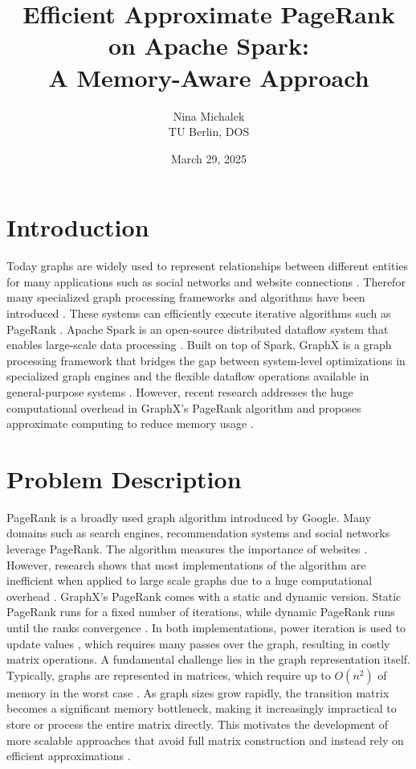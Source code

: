 \documentclass[a4paper,12pt]{article}
\title{Efficient Approximate PageRank on Apache Spark: \\ A Memory-Aware Approach}
\author{Nina Michalek\\TU Berlin, DOS}
\date{March 29, 2025}
\begin{document}
\maketitle

\begin{multicols}{2}

\section{Introduction}
Today graphs are widely used to represent relationships between different entities for many applications such as social networks and website connections \cite{zhang_distributed_2021}. Therefor many specialized graph processing frameworks and algorithms have been introduced \cite{meng_survey_2024}. These systems can efficiently execute iterative algorithms such as PageRank \cite{gonzalez_graphx_nodate}. Apache Spark is an open-source distributed dataflow system that enables large-scale data processing \cite{shanahan_large_2015}. Built on top of Spark, GraphX is a graph processing framework that bridges the gap between system-level optimizations in specialized graph engines and the flexible dataflow operations available in general-purpose systems \cite{noauthor_software_nodate}\cite{gonzalez_graphx_nodate}. However, recent research addresses the huge computational overhead in GraphX's PageRank algorithm and proposes approximate computing to reduce memory usage \cite{wu_efficient_2024}. 
 

\section{Problem Description}
PageRank is a broadly used graph algorithm introduced by Google. Many domains such as search engines, recommendation systems and social networks leverage PageRank. The algorithm measures the importance of websites \cite{wu_efficient_2024}. However, research shows that most implementations of the algorithm are inefficient when applied to large scale graphs due to a huge computational overhead \cite{wu_efficient_2024}\cite{jayaram_dynamic_2024}\cite{yang_efficient_2024}. GraphX's PageRank comes with a static and dynamic version. Static PageRank runs for a fixed number of iterations, while dynamic PageRank runs until the ranks convergence \cite{noauthor_graphx_nodate}. In both implementations, power iteration is used to update values \cite{xin_graphx_2013}, which requires many passes over the graph, resulting in costly matrix operations.  A fundamental challenge lies in the graph representation itself. Typically, graphs are represented in matrices, which require up to $O(n^2)$ of memory in the worst case \cite{wu_efficient_2024}. As graph sizes grow rapidly, the transition matrix becomes a significant memory bottleneck, making it increasingly impractical to store or process the entire matrix directly. This motivates the development of more scalable approaches that avoid full matrix construction and instead rely on efficient approximations \cite{meng_survey_2024}.




\end{multicols}
\end{document}

